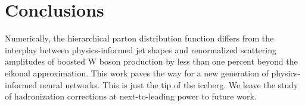 \section{Conclusions}\label{sec:conclusions}

Numerically, the hierarchical parton distribution function differs from
the interplay between physics-informed jet shapes and renormalized
scattering amplitudes of boosted W boson production by less than one
percent beyond the eikonal approximation. This work paves the way for a
new generation of physics-informed neural networks. This is just the tip
of the iceberg. We leave the study of hadronization corrections at
next-to-leading power to future work.

